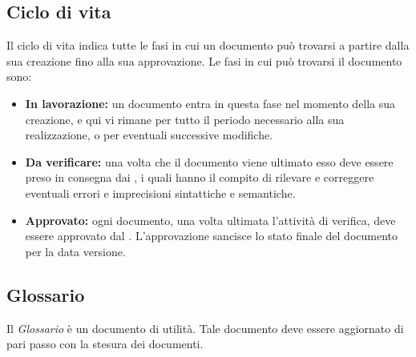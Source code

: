 \subsection{Ciclo di vita}
Il ciclo di vita indica tutte le fasi in cui un documento può trovarsi a partire dalla sua creazione fino alla sua approvazione. Le fasi in cui può trovarsi il documento sono:
\begin{itemize}
	\item \textbf{In lavorazione:} un documento entra in questa fase nel momento della sua creazione, e qui vi rimane per tutto il periodo necessario alla sua realizzazione, o per eventuali successive modifiche. 
	\item \textbf{Da verificare:} una volta che il documento viene ultimato esso deve essere preso in consegna dai \Verificatori{}, i quali hanno il compito di rilevare e correggere eventuali errori e imprecisioni sintattiche e semantiche. 
	\item \textbf{Approvato:} ogni documento, una volta ultimata l'attività di verifica, deve essere approvato dal \Responsabile{}. L'approvazione sancisce lo stato finale del documento per la data versione.
\end{itemize}

\subsection{Glossario}
Il \textit{Glossario} è un documento di utilità. Tale documento deve essere aggiornato di pari passo con la stesura dei documenti.
